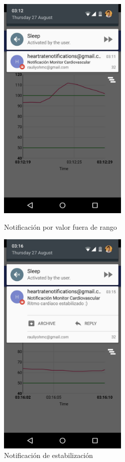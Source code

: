 \begin{figure}[H] \centering
	\begin{minipage}{0.45\textwidth}\centering
		\includegraphics[height=11cm]{graphs/AndroidNotificaciones.png} \caption{Notificación por valor fuera de rango}\label{fig:web:Notificaciones}
	\end{minipage}
	\hfill
	\begin{minipage}{0.45\textwidth}\centering
		\includegraphics[height=11cm]{graphs/AndroidReposo.png} \caption{Notificación de estabilización}\label{fig:web:Reposo}
	\end{minipage}
\end{figure}

